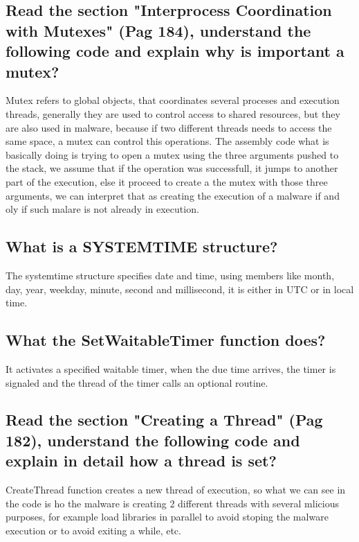 \documentclass[10pt,a4paper]{article} %
\begin{document}
        \subsection{Read the section "Interprocess Coordination with Mutexes" (Pag
        184), understand the following code and explain why is important a mutex?}

        Mutex refers to global objects, that coordinates several proceses and
        execution threads, generally they are used to control access to shared
        resources, but they are also used in malware, because if two different
        threads needs to access the same space, a mutex can control this
        operations. The assembly code what is basically doing is trying to open a
        mutex using the three arguments pushed to the stack, we assume that if the
        operation was successfull, it jumps to another part of the execution, else
        it proceed to create a the mutex with those three arguments, we can
        interpret that as creating the execution of a malware if and oly if such
        malare is not already in execution.

        \subsection{What is a SYSTEMTIME structure?}

        The systemtime structure specifies date and time, using members like month,
        day, year, weekday, minute, second and millisecond, it is either in UTC or
        in local time.

        \subsection{What the SetWaitableTimer function does?}

        It activates a specified waitable timer, when the due time arrives, the
        timer is signaled and the thread of the timer calls an optional routine.

        \subsection{Read the section "Creating a Thread" (Pag 182), understand the
        following code and explain in detail how a thread is set?}

        CreateThread function creates a new thread of execution, so what we can see
        in the code is ho the malware is creating 2 different threads with several
        mlicious purposes, for example load libraries in parallel to avoid stoping
        the malware execution or to avoid exiting a while, etc.
\end{document}
